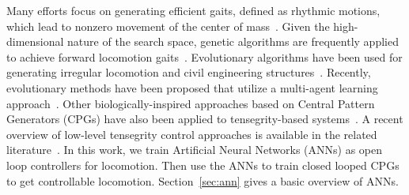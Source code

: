 Many efforts focus on generating efficient gaits, defined as rhythmic
motions, which lead to nonzero movement of the center of
mass~\cite{McIsaac:2003kl}.  Given the high-dimensional nature of the
search space, genetic algorithms are frequently applied to achieve
forward locomotion gaits~\cite{Paul2006a}. Evolutionary algorithms
have been used for generating irregular locomotion and civil
engineering structures~\cite{Rieffel2009Automated-Disco,
veuve2015deployment}. Recently, evolutionary methods have been
proposed that utilize a multi-agent learning
approach~\cite{Iscen2013Controlling-Ten}.  Other biologically-inspired
approaches based on Central Pattern Generators (CPGs) have also
been applied to tensegrity-based
systems~\cite{Bliss2013Central-Pattern, MirletzSoftRobotics,
Caluwaerts2013rsif}. 
A recent overview of low-level tensegrity
control approaches is available in the related literature~\cite[Table
2]{Caluwaerts2013rsif}. 
In this work, we train Artificial Neural Networks (ANNs) as open loop controllers for locomotion.
Then use the ANNs to train closed looped CPGs to get controllable locomotion.
Section~\ref{sec:ann} gives a basic overview of ANNs.





